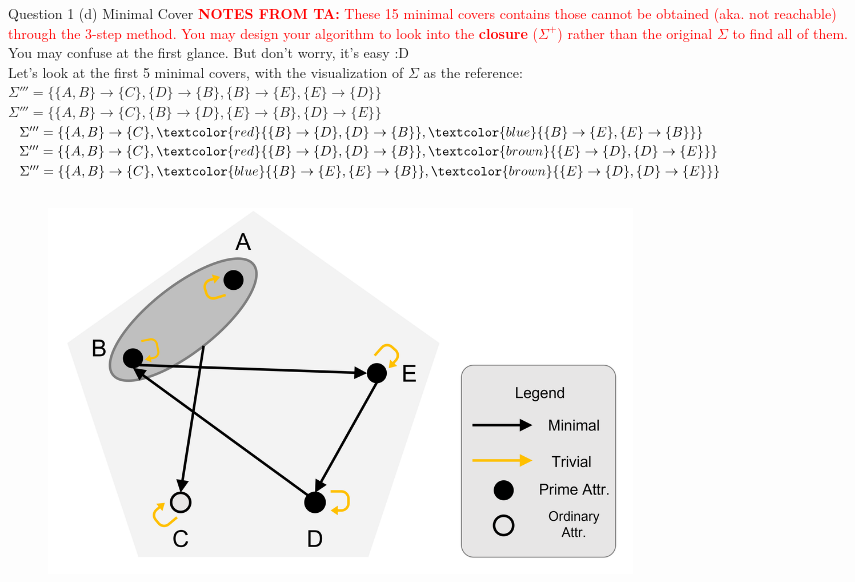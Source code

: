 \begin{frame}[fragile]{Question 1 (d) Minimal Cover}
	{\small\textcolor{red}{\textbf{NOTES FROM TA:} These 15 minimal covers contains those cannot be obtained (aka. not reachable) through the 3-step method. You may design your algorithm to look into the \textbf{closure} ($\Sigma^{+}$) rather than the original $\Sigma$ to find all of them.}} \\
	You may confuse at the first glance. But don't worry, it's easy :D\\\vspace{2pt}
	Let's look at the first 5 minimal covers, with the visualization of $\Sigma$ as the reference:\\\vspace{3pt}
	{\footnotesize
		$\Sigma'''=\{\{A, B\} \rightarrow \{C\}, \{D\} \rightarrow \{B\}, \{B\} \rightarrow \{E\}, \{E\} \rightarrow \{D\}\}$ \\\vspace{2pt}
		$\Sigma'''=\{\{A, B\} \rightarrow \{C\}, \{B\} \rightarrow \{D\}, \{E\} \rightarrow \{B\}, \{D\} \rightarrow \{E\}\}$ \\\vspace{4pt}
		$\Sigma'''=\{\{A, B\} \rightarrow \{C\}, \textcolor{red}{\{B\} \rightarrow \{D\}, \{D\} \rightarrow \{B\}}, \textcolor{blue}{\{B\} \rightarrow \{E\}, \{E\} \rightarrow \{B\}}\}$ \\\vspace{2pt}
		$\Sigma'''=\{\{A, B\} \rightarrow \{C\}, \textcolor{red}{\{B\} \rightarrow \{D\}, \{D\} \rightarrow \{B\}}, \textcolor{brown}{\{E\} \rightarrow \{D\}, \{D\} \rightarrow \{E\}}\}$ \\\vspace{2pt}
		$\Sigma'''=\{\{A, B\} \rightarrow \{C\}, \textcolor{blue}{\{B\} \rightarrow \{E\}, \{E\} \rightarrow \{B\}}, \textcolor{brown}{\{E\} \rightarrow \{D\}, \{D\} \rightarrow \{E\}}\}$ \\\vspace{2pt}
	}
	\vspace{5pt}
	\begin{columns}[t]
	\begin{figure}
		\includegraphics[width=0.75\textwidth, trim=0 0 0 0, clip]{4221-t3/images/q1.png}
	\end{figure}


\end{columns}
\end{frame}
